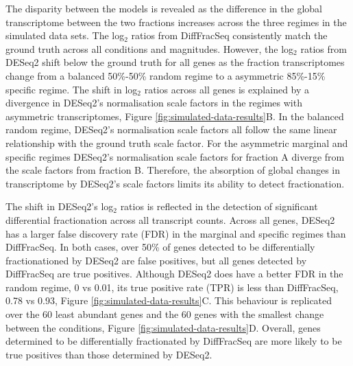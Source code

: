 \documentclass[../main.tex]{subfiles}
\begin{document}
The disparity between the models is revealed as the difference in the global transcriptome between the two fractions increases across the three regimes in the simulated data sets.
The log$_2$ ratios from DiffFracSeq consistently match the ground truth across all conditions and magnitudes.
However, the log$_2$ ratios from DESeq2 shift below the ground truth for all genes as the fraction transcriptomes change from a balanced 50\%-50\% random regime to a asymmetric 85\%-15\% specific regime.
The shift in log$_2$ ratios across all genes is explained by a divergence in DESeq2's normalisation scale factors in the regimes with asymmetric transcriptomes, Figure \ref{fig:simulated-data-results}B.
In the balanced random regime, DESeq2's normalisation scale factors all follow the same linear relationship with the ground truth scale factor.
For the asymmetric marginal and specific regimes DESeq2's normalisation scale factors for fraction A diverge from the scale factors from fraction B.
Therefore, the absorption of global changes in transcriptome by DESeq2's scale factors limits its ability to detect fractionation.

The shift in DESeq2's log$_2$ ratios is reflected in the detection of significant differential fractionation across all transcript counts.
Across all genes, DESeq2 has a larger false discovery rate (FDR) in the marginal and specific regimes than DiffFracSeq.
In both cases, over 50\% of genes detected to be differentially fractionationed by DESeq2 are false positives, but all genes detected by DiffFracSeq are true positives.
Although DESeq2 does have a better FDR in the random regime, 0 vs 0.01, its true positive rate (TPR) is less than DiffFracSeq, 0.78 vs 0.93, Figure \ref{fig:simulated-data-results}C.
This behaviour is replicated over the 60 least abundant genes and the 60 genes with the smallest change between the conditions, Figure \ref{fig:simulated-data-results}D.
Overall, genes determined to be differentially fractionated by DiffFracSeq are more likely to be true positives than those determined by DESeq2.
\end{document}
